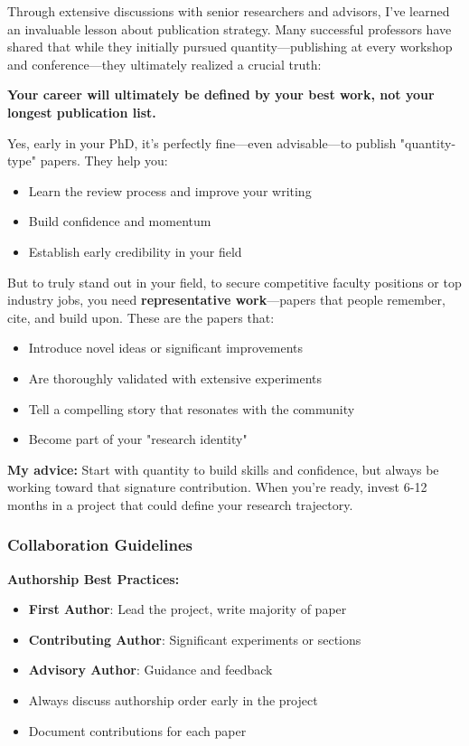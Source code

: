 \documentclass[11pt,a4paper]{article}
\begin{document}
\begin{tcolorbox}[colback=purple!5,colframe=purple!40,title={\faUserGraduate~My Personal Reflection: Quality Over Quantity}]
Through extensive discussions with senior researchers and advisors, I've learned an invaluable lesson about publication strategy. Many successful professors have shared that while they initially pursued quantity—publishing at every workshop and conference—they ultimately realized a crucial truth:

\textbf{Your career will ultimately be defined by your best work, not your longest publication list.}

Yes, early in your PhD, it's perfectly fine—even advisable—to publish "quantity-type" papers. They help you:
\begin{itemize}[leftmargin=1.5em]
    \item Learn the review process and improve your writing
    \item Build confidence and momentum
    \item Establish early credibility in your field
\end{itemize}

But to truly stand out in your field, to secure competitive faculty positions or top industry jobs, you need \textbf{representative work}—papers that people remember, cite, and build upon. These are the papers that:
\begin{itemize}[leftmargin=1.5em]
    \item Introduce novel ideas or significant improvements
    \item Are thoroughly validated with extensive experiments
    \item Tell a compelling story that resonates with the community
    \item Become part of your "research identity"
\end{itemize}

\textbf{My advice:} Start with quantity to build skills and confidence, but always be working toward that signature contribution. When you're ready, invest 6-12 months in a project that could define your research trajectory. 
\end{tcolorbox}

\subsubsection{Collaboration Guidelines}

\textbf{Authorship Best Practices:}
\begin{itemize}
    \item \textbf{First Author}: Lead the project, write majority of paper
    \item \textbf{Contributing Author}: Significant experiments or sections
    \item \textbf{Advisory Author}: Guidance and feedback
    \item Always discuss authorship order early in the project
    \item Document contributions for each paper
\end{itemize}
\end{document}
